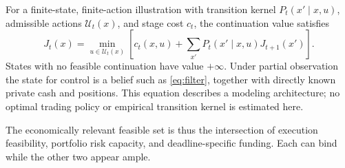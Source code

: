 For a finite-state, finite-action illustration with transition kernel $P_t(x'\mid x,u)$, admissible actions $\mathcal U_t(x)$, and stage cost $c_t$, the continuation value satisfies
\begin{equation}
 J_t(x)=\min_{u\in\mathcal U_t(x)}
 \left[c_t(x,u)+\sum_{x'}P_t(x'\mid x,u)J_{t+1}(x')\right].
\end{equation}
States with no feasible continuation have value $+\infty$. Under partial observation the state for control is a belief such as \eqref{eq:filter}, together with directly known private cash and positions. This equation describes a modeling architecture; no optimal trading policy or empirical transition kernel is estimated here.

The economically relevant feasible set is thus the intersection of execution feasibility, portfolio risk capacity, and deadline-specific funding. Each can bind while the other two appear ample.
\FloatBarrier
